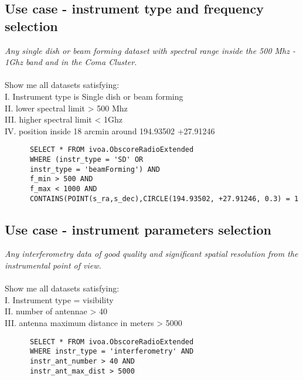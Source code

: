 \subsection{Use case - instrument type and frequency selection }
\textit{Any single dish or beam forming dataset  with spectral range inside the 500 Mhz - 1Ghz band and in the Coma Cluster.}\\ \\
Show me all datasets satisfying:\\
I. Instrument type is Single dish or beam forming \\
II. lower spectral limit > 500 Mhz \\
III. higher spectral limit < 1Ghz \\
IV. position inside 18 arcmin around 194.93502 +27.91246

\begin{verbatim}
      SELECT * FROM ivoa.ObscoreRadioExtended
      WHERE (instr_type = 'SD' OR
      instr_type = 'beamForming') AND
      f_min > 500 AND
      f_max < 1000 AND
      CONTAINS(POINT(s_ra,s_dec),CIRCLE(194.93502, +27.91246, 0.3) = 1     
\end{verbatim}




\subsection{Use case - instrument parameters selection }
\textit{Any interferometry data of good quality and significant spatial resolution from the instrumental point of view. }\\ \\
Show me all datasets satisfying:\\
I. Instrument type = visibility \\
II. number of antennae > 40 \\
III. antenna maximum distance in meters  > 5000 \\

\begin{verbatim}
      SELECT * FROM ivoa.ObscoreRadioExtended
      WHERE instr_type = 'interferometry' AND
      instr_ant_number > 40 AND
      instr_ant_max_dist > 5000 
\end{verbatim}




